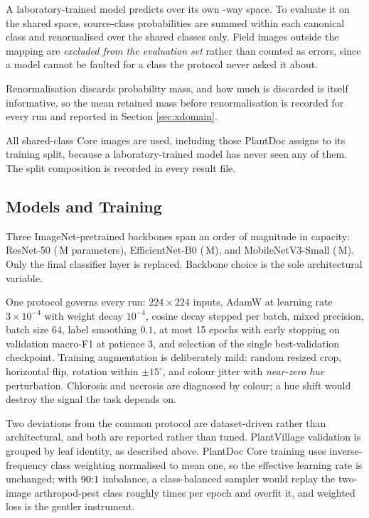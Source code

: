 \documentclass[runningheads]{llncs}
\begin{document}
A laboratory-trained model predicts over its own \NPvClasses{}-way space. To
evaluate it on the shared space, source-class probabilities are summed within
each canonical class and renormalised over the \NSharedClasses{} shared classes
only. Field images outside the mapping are \emph{excluded from the evaluation
set} rather than counted as errors, since a model cannot be faulted for a class
the protocol never asked it about.

Renormalisation discards probability mass, and how much is discarded is itself
informative, so the mean retained mass before renormalisation is recorded for
every run and reported in Section \ref{sec:xdomain}.

All \NXdImages{} shared-class Core images are used, including those PlantDoc
assigns to its training split, because a laboratory-trained model has never seen
any of them. The split composition is recorded in every result file.

\subsection{Models and Training}

Three ImageNet-pretrained \cite{deng2009imagenet} backbones span an order of
magnitude in capacity: ResNet-50 \cite{he2016resnet} (\ParamsRn{}\,M
parameters), EfficientNet-B0 \cite{tan2019efficientnet} (\ParamsEb{}\,M), and
MobileNetV3-Small \cite{howard2019mobilenetv3} (\ParamsMn{}\,M). Only the final
classifier layer is replaced. Backbone choice is the sole architectural
variable.

One protocol governs every run: $224 \times 224$ inputs, AdamW at learning rate
$3\times10^{-4}$ with weight decay $10^{-4}$, cosine decay stepped per batch,
mixed precision, batch size 64, label smoothing $0.1$, at most 15 epochs with
early stopping on validation macro-F1 at patience 3, and selection of the single
best-validation checkpoint. Training augmentation is deliberately mild:
random resized crop, horizontal flip, rotation within $\pm15^{\circ}$, and
colour jitter with \emph{near-zero hue} perturbation. Chlorosis and necrosis are
diagnosed by colour; a hue shift would destroy the signal the task depends on.

Two deviations from the common protocol are dataset-driven rather than
architectural, and both are reported rather than tuned. PlantVillage validation
is grouped by leaf identity, as described above. PlantDoc Core training uses
inverse-frequency class weighting normalised to mean one, so the effective
learning rate is unchanged; with $90{}{:}1$ imbalance, a class-balanced sampler
would replay the two-image arthropod-pest class roughly \PdcImbalance{} times per epoch
and overfit it, and weighted loss is the gentler instrument.
\end{document}
